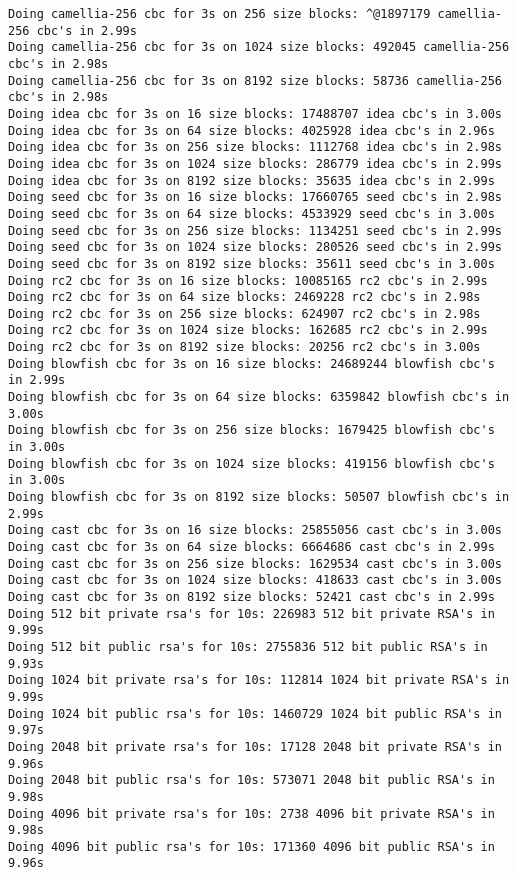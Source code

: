 \documentclass[%
 aip,
 jmp,%
 amsmath,amssymb,
 reprint,%
]{revtex4-1}
\begin{document}
\begin{verbatim}
Doing camellia-256 cbc for 3s on 256 size blocks: ^@1897179 camellia-256 cbc's in 2.99s
Doing camellia-256 cbc for 3s on 1024 size blocks: 492045 camellia-256 cbc's in 2.98s
Doing camellia-256 cbc for 3s on 8192 size blocks: 58736 camellia-256 cbc's in 2.98s
Doing idea cbc for 3s on 16 size blocks: 17488707 idea cbc's in 3.00s
Doing idea cbc for 3s on 64 size blocks: 4025928 idea cbc's in 2.96s
Doing idea cbc for 3s on 256 size blocks: 1112768 idea cbc's in 2.98s
Doing idea cbc for 3s on 1024 size blocks: 286779 idea cbc's in 2.99s
Doing idea cbc for 3s on 8192 size blocks: 35635 idea cbc's in 2.99s
Doing seed cbc for 3s on 16 size blocks: 17660765 seed cbc's in 2.98s
Doing seed cbc for 3s on 64 size blocks: 4533929 seed cbc's in 3.00s
Doing seed cbc for 3s on 256 size blocks: 1134251 seed cbc's in 2.99s
Doing seed cbc for 3s on 1024 size blocks: 280526 seed cbc's in 2.99s
Doing seed cbc for 3s on 8192 size blocks: 35611 seed cbc's in 3.00s
Doing rc2 cbc for 3s on 16 size blocks: 10085165 rc2 cbc's in 2.99s
Doing rc2 cbc for 3s on 64 size blocks: 2469228 rc2 cbc's in 2.98s
Doing rc2 cbc for 3s on 256 size blocks: 624907 rc2 cbc's in 2.98s
Doing rc2 cbc for 3s on 1024 size blocks: 162685 rc2 cbc's in 2.99s
Doing rc2 cbc for 3s on 8192 size blocks: 20256 rc2 cbc's in 3.00s
Doing blowfish cbc for 3s on 16 size blocks: 24689244 blowfish cbc's in 2.99s
Doing blowfish cbc for 3s on 64 size blocks: 6359842 blowfish cbc's in 3.00s
Doing blowfish cbc for 3s on 256 size blocks: 1679425 blowfish cbc's in 3.00s
Doing blowfish cbc for 3s on 1024 size blocks: 419156 blowfish cbc's in 3.00s
Doing blowfish cbc for 3s on 8192 size blocks: 50507 blowfish cbc's in 2.99s
Doing cast cbc for 3s on 16 size blocks: 25855056 cast cbc's in 3.00s
Doing cast cbc for 3s on 64 size blocks: 6664686 cast cbc's in 2.99s
Doing cast cbc for 3s on 256 size blocks: 1629534 cast cbc's in 3.00s
Doing cast cbc for 3s on 1024 size blocks: 418633 cast cbc's in 3.00s
Doing cast cbc for 3s on 8192 size blocks: 52421 cast cbc's in 2.99s
Doing 512 bit private rsa's for 10s: 226983 512 bit private RSA's in 9.99s
Doing 512 bit public rsa's for 10s: 2755836 512 bit public RSA's in 9.93s
Doing 1024 bit private rsa's for 10s: 112814 1024 bit private RSA's in 9.99s
Doing 1024 bit public rsa's for 10s: 1460729 1024 bit public RSA's in 9.97s
Doing 2048 bit private rsa's for 10s: 17128 2048 bit private RSA's in 9.96s
Doing 2048 bit public rsa's for 10s: 573071 2048 bit public RSA's in 9.98s
Doing 4096 bit private rsa's for 10s: 2738 4096 bit private RSA's in 9.98s
Doing 4096 bit public rsa's for 10s: 171360 4096 bit public RSA's in 9.96s

\end{verbatim}
\end{document}
